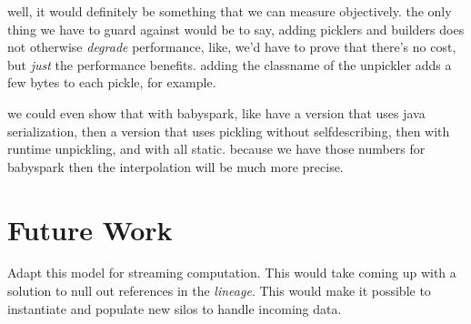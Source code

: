 \documentclass{sigplanconf}
\theoremstyle{definition}
\theoremstyle{definition}
\begin{document}
well, it would definitely be something that we can measure objectively. the
only thing we have to guard against would be to say, adding picklers and
builders does not otherwise \emph{degrade} performance, like, we'd have to
prove that there's no cost, but \emph{just} the performance benefits. adding
the classname of the unpickler adds a few bytes to each pickle, for example.

we could even show that with babyspark, like have a version that uses java
serialization, then a version that uses pickling without selfdescribing, then
with runtime unpickling, and with all static. because we have those numbers
for babyspark then the interpolation will be much more precise.



\section{Future Work}

Adapt this model for streaming computation. This would take coming up with a
solution to null out references in the {\em lineage}. This would make it possible to instantiate and populate new silos to handle incoming data.












\end{document}
